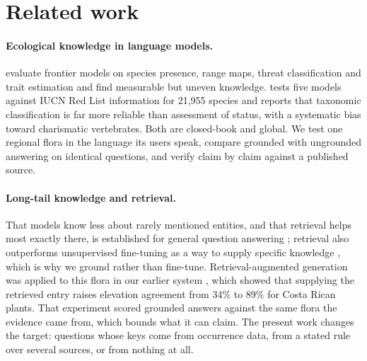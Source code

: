 \documentclass[11pt,a4paper]{article}
\begin{document}
\section{Related work}\label{sec:related}

\paragraph{Ecological knowledge in language models.} \citet{dorm2025ecological}
evaluate frontier models on species presence, range maps, threat classification and
trait estimation and find measurable but uneven knowledge. \citet{uryu2025iucn} tests
five models against IUCN Red List information for 21{,}955 species and reports that
taxonomic classification is far more reliable than assessment of status, with a
systematic bias toward charismatic vertebrates. Both are closed-book and global. We
test one regional flora in the language its users speak, compare grounded with
ungrounded answering on identical questions, and verify claim by claim against a
published source.

\paragraph{Long-tail knowledge and retrieval.} That models know less about rarely
mentioned entities, and that retrieval helps most exactly there, is established for
general question answering \citep{kandpal2023longtail,mallen2023popqa}; retrieval
also outperforms unsupervised fine-tuning as a way to supply specific knowledge
\citep{ovadia2024finetuning}, which is why we ground rather than fine-tune.
Retrieval-augmented generation \citep{lewis2020rag} was applied to this flora in our
earlier system \citep{araya2026grounding}, which showed that supplying the retrieved
entry raises elevation agreement from 34\% to 89\% for Costa Rican plants. That
experiment scored grounded answers against the same flora the evidence came from,
which bounds what it can claim. The present work changes the target: questions whose
keys come from occurrence data, from a stated rule over several sources, or from
nothing at all.
\end{document}
